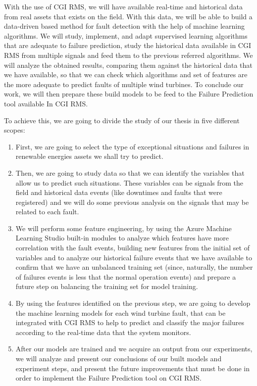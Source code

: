 With the use of CGI RMS, we will have available real-time and historical data from real assets that exists on the field. With this data, we will be able to build a data-driven based method for fault detection with the help of machine learning algorithms. We will study, implement, and adapt supervised learning algorithms that are adequate to failure prediction, study the historical data available in CGI RMS from multiple signals and feed them to the previous referred algorithms. We will analyze the obtained results, comparing them against the historical data that we have available, so that we can check which algorithms and set of features are the more adequate to predict faults of multiple wind turbines. To conclude our work, we will then prepare these build models to be feed to the Failure Prediction tool available In CGI RMS.

To achieve this, we are going to divide the study of our thesis in five different scopes:

\begin{enumerate}
\item 
First, we are going to select the type of exceptional situations and failures in renewable energies assets we shall try to predict.

\item 
Then, we are going to study data so that we can identify the variables that allow us to predict such situations. These variables can be signals from the field and historical data events (like downtimes and faults that were registered) and we will do some previous analysis on the signals that may be related to each fault.

\item
We will perform some feature engineering, by using the Azure Machine Learning Studio built-in modules to analyze which features have more correlation with the fault events, building new features from the initial set of variables and to analyze our historical failure events that we have available to confirm that we have an unbalanced training set (since, naturally, the number of failures events is less that the normal operation events) and prepare a future step on balancing the training set for model training.

\item 
By using the features identified on the previous step, we are going to develop the machine learning models for each wind turbine fault, that can be integrated with CGI RMS to help to predict and classify the major failures according to the real-time data that the system monitors.

\item 
After our models are trained and we acquire an output from our experiments, we will analyze and present our conclusions of our built models and experiment steps, and present the future improvements that must be done in order to implement the Failure Prediction tool on CGI RMS.

\end{enumerate}


